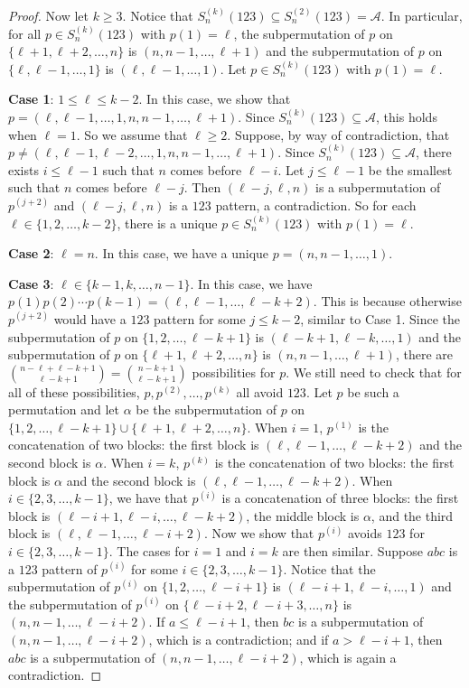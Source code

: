 \documentclass[10pt,a4paper]{amsart}
\numberwithin{equation}{section}
\begin{document}
\begin{proof}
Now let $k\geq3$. Notice that $S_n^{(k)}(123)\subseteq S_n^{(2)}(123)=\mathcal{A}$. In particular, for all $p\in S_n^{(k)}(123)$ with $p(1)=\ell$, the subpermutation of $p$ on $\{\ell+1,\ell+2,\ldots,n\}$ is $(n,n-1,\ldots,\ell+1)$ and the subpermutation of $p$ on $\{\ell,\ell-1,\ldots,1\}$ is $(\ell,\ell-1,\ldots,1)$. Let $p\in S_n^{(k)}(123)$ with $p(1)=\ell$.

\textbf{Case 1}: $1\leq \ell\leq k-2$.
In this case, we show that $p=(\ell,\ell-1,\ldots,1,n,n-1,\ldots,\ell+1)$. 
Since $S_n^{(k)}(123)\subseteq\mathcal{A}$, this holds when $\ell=1$. So we assume that $\ell\geq2$. Suppose, by way of contradiction, that $p\neq (\ell,\ell-1,\ell-2,\ldots,1,n,n-1,\ldots,\ell+1)$. Since $S_n^{(k)}(123)\subseteq\mathcal{A}$, there exists $i\leq \ell-1$ such that $n$ comes before $\ell-i$. Let $j\leq \ell-1$ be the smallest such that $n$ comes before $\ell-j$. Then $(\ell-j,\ell,n)$ is a subpermutation of $p^{(j+2)}$ 
and $(\ell-j,\ell,n)$ is a $123$ pattern, a contradiction. So for each $\ell\in\{1,2,\ldots,k-2\}$, there is a unique $p\in S_n^{(k)}(123)$ with $p(1)=\ell$.

\textbf{Case 2}: $\ell=n$. In this case, we have a unique $p=(n,n-1,\ldots,1)$.

\textbf{Case 3}: $\ell\in\{k-1,k,\ldots,n-1\}$. 
In this case, we have $p(1)p(2)\cdots p(k-1)=(\ell,\ell-1,\ldots,\ell-k+2)$. 
This is because otherwise 
$p^{(j+2)}$ would have a $123$ pattern for some $j\leq k-2$, similar to Case 1.
Since the subpermutation of $p$ on $\{1,2,\ldots,\ell-k+1\}$ is $(\ell-k+1,\ell-k,\ldots,1)$ and the subpermutation of $p$ on $\{\ell+1,\ell+2,\ldots,n\}$ is $(n,n-1,\ldots,\ell+1)$, there are $\binom{n-\ell+\ell-k+1}{\ell-k+1}=\binom{n-k+1}{\ell-k+1}$ possibilities for $p$. 
We still need to check that for all of these possibilities, $p,p^{(2)},\ldots,p^{(k)}$ all avoid $123$. Let $p$ be such a permutation and let $\alpha$ be the subpermutation of $p$ on $\{1,2,\ldots,\ell-k+1\}\cup\{\ell+1,\ell+2,\ldots,n\}$. When $i=1$, 
$p^{(1)}$ is the concatenation of two blocks: the first block is $(\ell,\ell-1,\ldots,\ell-k+2)$ and the second block is $\alpha$. 
When $i=k$, 
$p^{(k)}$ is the concatenation of two blocks: the first block is $\alpha$ and the second block is $(\ell,\ell-1,\ldots,\ell-k+2)$. When $i\in\{2,3,\ldots,k-1\}$, we have that $p^{(i)}$ is a concatenation of three blocks: the first block is $(\ell-i+1,\ell-i,\ldots,\ell-k+2)$, the middle block is $\alpha$, and the third block is $(\ell,\ell-1,\ldots,\ell-i+2)$. 
Now we show that $p^{(i)}$ avoids $123$ for $i\in\{2,3,\ldots,k-1\}$. The cases for $i=1$ and $i=k$ are then similar. Suppose $abc$ is a $123$ pattern of $p^{(i)}$ for some $i\in\{2,3,\ldots,k-1\}$. Notice that the subpermutation of $p^{(i)}$ on $\{1,2,\ldots,\ell-i+1\}$ is $(\ell-i+1,\ell-i,\ldots,1)$ and the subpermutation of $p^{(i)}$ on $\{\ell-i+2,\ell-i+3,\ldots,n\}$ is $(n,n-1,\ldots,\ell-i+2)$. If $a\leq \ell-i+1$, then $bc$ is a subpermutation of $(n,n-1,\ldots,\ell-i+2)$, which is a contradiction; and if $a>\ell-i+1$, then $abc$ is a subpermutation of $(n,n-1,\ldots,\ell-i+2)$, which is again a contradiction.


\end{proof}
\end{document}
